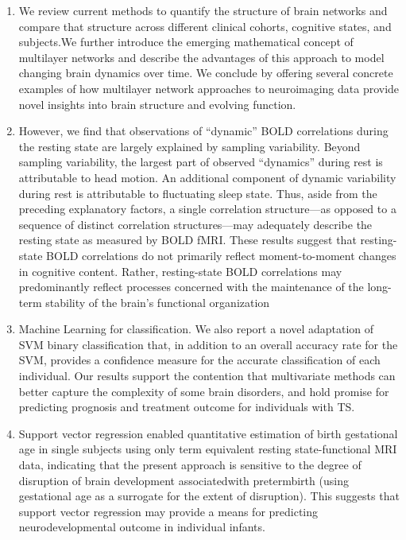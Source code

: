 \documentclass[12pt]{article}
\begin{document}
\begin{enumerate}
\begin{enumerate}
\item \cite{muldoon} We review current methods to quantify the structure of brain networks and compare that structure across different clinical cohorts, cognitive states, and subjects.We further introduce the emerging mathematical concept of multilayer networks and describe the advantages of this approach to model changing brain dynamics over time. We conclude by offering several concrete examples of how multilayer network approaches to neuroimaging data provide novel insights into brain structure and evolving function.
\item \cite{peterson11} However, we find that observations of “dynamic” BOLD correlations during the resting state are largely explained by sampling variability. Beyond sampling variability, the largest part of observed “dynamics” during rest is attributable to head motion. An additional component of dynamic variability during rest is attributable to fluctuating sleep state. Thus, aside from the preceding explanatory factors, a single correlation structure—as opposed to a sequence of distinct correlation structures—may adequately describe the resting state as measured by BOLD fMRI. These results suggest that resting-state BOLD correlations do not primarily reflect moment-to-moment changes in cognitive content. Rather, resting-state BOLD correlations may predominantly reflect processes concerned with the maintenance of the long-term stability of the brain’s functional organization
\item \cite{peterson12} Machine Learning for classification. We also report a novel adaptation of SVM binary classification that, in addition to an overall accuracy rate for the SVM, provides a confidence measure for the accurate classification of each individual. Our results support the contention that multivariate methods can better capture the complexity of some brain disorders, and hold promise for predicting prognosis and treatment outcome for individuals with TS.
\item \cite{peterson17} Support vector regression enabled quantitative estimation of birth gestational age in single subjects using only term equivalent resting state-functional MRI data, indicating that the present approach is sensitive to the degree of disruption of brain development associatedwith pretermbirth (using gestational age as a surrogate for the extent of disruption). This suggests that support vector regression may provide a means for predicting neurodevelopmental outcome in individual infants.

\end{enumerate}
\end{enumerate}
\end{document}
